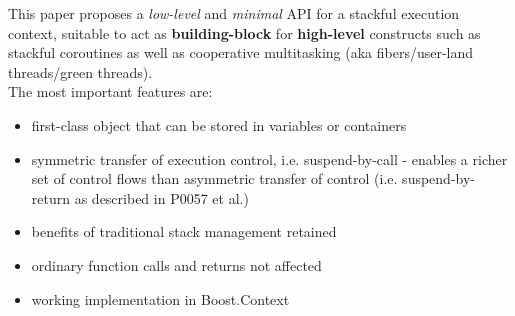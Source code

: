 This paper proposes a \emph{low-level} and \emph{minimal} API for a stackful
execution context, suitable to act as {\bfseries building-block} for
{\bfseries high-level} constructs such as stackful coroutines as well as
cooperative multitasking (aka fibers/user-land threads/green threads).\\
\newline
The most important features are:
\begin{itemize}
    \item first-class object that can be stored in variables or containers
    \item symmetric transfer of execution control, i.e. suspend-by-call -
          enables a richer set of control flows than asymmetric transfer of
          control (i.e. suspend-by-return as described in P0057\cite{P0057} et al.)
    \item benefits of traditional stack management retained
    \item ordinary function calls and returns not affected
    \item working implementation in Boost.Context\cite{bcontext}
\end{itemize}
